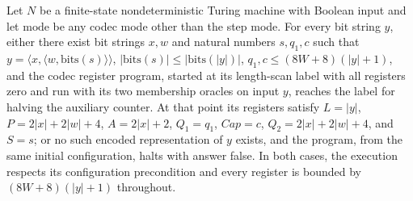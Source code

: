 \begin{theorem}
\label{Complexity.Codec.parse_run}
\leanok
{}
Let $N$ be a finite-state nondeterministic Turing machine with Boolean input and let
$\mathrm{mode}$ be any codec mode other than the step mode. For every bit string $y$,
either there exist bit strings $x,w$ and natural numbers $s,q_1,c$ such that $y=\langle
x,\langle w,\mathrm{bits}(s)\rangle\rangle$, $|\mathrm{bits}(s)|\leq
|\mathrm{bits}(|y|)|$, $q_1,c\leq (8W+8)(|y|+1)$, and the codec register program,
started at its length-scan label with all registers zero and run with its two membership
oracles on input $y$, reaches the label for halving the auxiliary counter. At that point
its registers satisfy $L=|y|$, $P=2|x|+2|w|+4$, $A=2|x|+2$, $Q_1=q_1$, $Cap=c$,
$Q_2=2|x|+2|w|+4$, and $S=s$; or no such encoded representation of $y$ exists, and the
program, from the same initial configuration, halts with answer false. In both cases,
the execution respects its configuration precondition and every register is bounded by
$(8W+8)(|y|+1)$ throughout.
\end{theorem}

